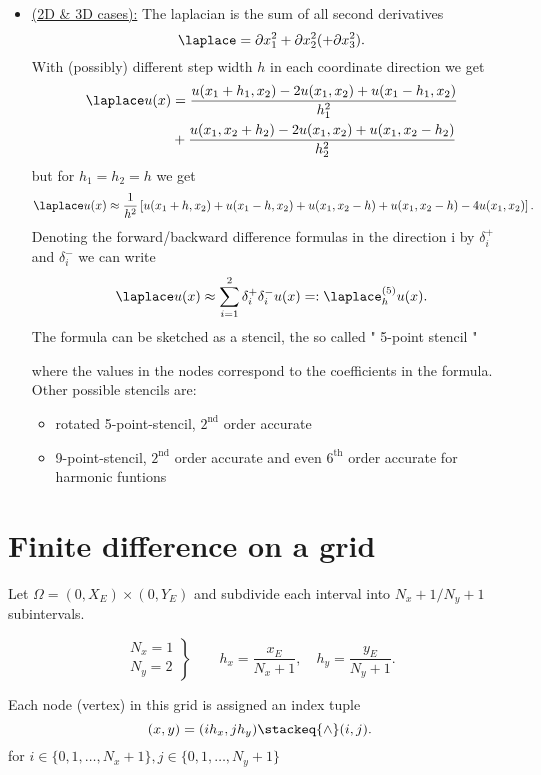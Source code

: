 \begin{itemize}
	\item \underline{(2D \& 3D cases):} 
		The laplacian is the sum of all second derivatives
		\[
			\laplace = \partial x_1^2 + \partial x_2^2 (+\partial x_3^2)
		.\] 
		With (possibly) different step width $h$ in each coordinate direction we get
		\begin{align*}
			\laplace u(x) &= \frac{u(x_1 + h_1, x_2) - 2u(x_1, x_2) + u(x_1 -h_1, x_2)}{h_1^2}\\
						  &+ \frac{u(x_1, x_2 + h_2) - 2u(x_1, x_2) + u(x_1, x_2 -h_2)}{h_2^2}
		\end{align*}
		but for $h_1 = h_2 = h$ we get
		\[
			\laplace u(x) \approx \frac{1}{h^2}\left[u(x_1+ h, x_2) + u(x_1-h, x_2) + u(x_1, x_2 -h) + u(x_1, x_2 -h) -4u(x_1, x_2)\right]
		.\] 
		Denoting the forward/backward difference formulas
		in the direction i by $\delta_{i}^{+}$ and $\delta_{i}^{-}$ we can write
		\[
			\laplace u(x) \approx \sum_{i=1}^{2}{\delta_{i}^{+}\delta_{i}^{-}u(x)}=:\laplace_{h}^{(5)}u(x)
		.\] 
		The formula can be sketched as a stencil, the so called " 5-point stencil "
		
		where the values in the nodes correspond to the coefficients in the formula.
		Other possible stencils are:
		\begin{itemize}
			\item rotated 5-point-stencil, $2^{\text{nd}}$ order accurate
				
			\item 9-point-stencil,  $2^{\text{nd}}$ order accurate and even $6^{\text{th}}$ order accurate for harmonic funtions
				
		\end{itemize}
\end{itemize}

\section{Finite difference on a grid}%
\label{sec:Finite difference on a grid}
Let $\Omega =(0, X_{E}) \times (0,Y_{E})$ and subdivide each interval into $N_{x}+1 / N_{y} + 1$ subintervals.

\[
\left.
	\begin{array}{c}
	N_{x} = 1 \\
	N_{y} = 2
\end{array}
\right\} \qquad
h_{x} = \frac{x_{E}}{N_{x}+1}, \quad h_{y}= \frac{y_{E}}{N_{y}+1}
.\] 


Each node (vertex) in this grid is assigned an index tuple
\[
	(x,y) = (ih_{x}, jh_{y}) \stackeq{\wedge} (i,j)
.\] 
for $i \in \{0,1, \ldots , N_{x}+1\}, j \in  \{0,1, \ldots , N_{y}+1\}$

